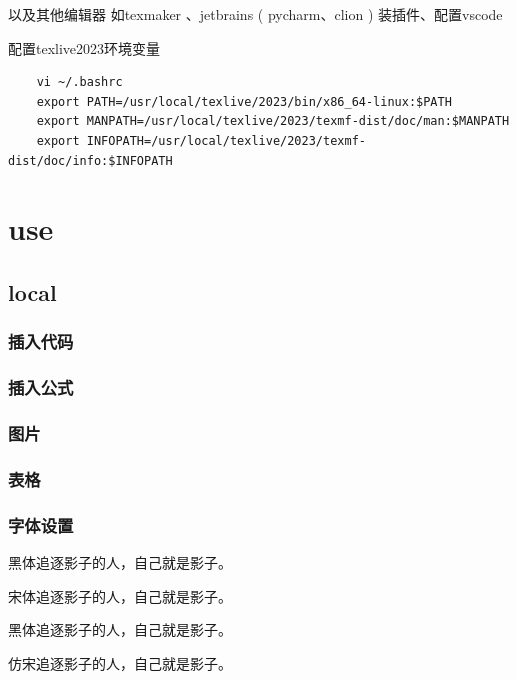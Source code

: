 \documentclass[11pt]{ctexart}
\begin{document}
以及其他编辑器 如texmaker 、jetbrains ( pycharm、clion ) 装插件、配置vscode


配置texlive2023环境变量

\begin{lstlisting}
	vi ~/.bashrc
	export PATH=/usr/local/texlive/2023/bin/x86_64-linux:$PATH
	export MANPATH=/usr/local/texlive/2023/texmf-dist/doc/man:$MANPATH
	export INFOPATH=/usr/local/texlive/2023/texmf-dist/doc/info:$INFOPATH
\end{lstlisting}




\newpage

\section{use}

\subsection{local}

\subsubsection{ 插入代码}

\subsubsection{插入公式}

\subsubsection{图片}


 
 \subsubsection{表格}
 
 \subsubsection{字体设置}
 
 {\heiti{} 黑体\qquad 追逐影子的人，自己就是影子。}
 
 {\songti{} 宋体\qquad 追逐影子的人，自己就是影子。}
 
    {\heiti{} 黑体\qquad 追逐影子的人，自己就是影子。}
 
 {\fangsong{} 仿宋\qquad 追逐影子的人，自己就是影子。}
 
\end{document}
